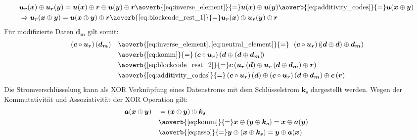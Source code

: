 \begin{align}
& \boldsymbol{u_r}(\boldsymbol{x}) \oplus \boldsymbol{u_r}(\boldsymbol{y}) = \boldsymbol{u}(\boldsymbol{x}) \oplus \boldsymbol{r} \oplus \boldsymbol{u}(\boldsymbol{y}) \oplus \boldsymbol{r} \aoverb{\ref{eq:inverse_element}}{=} \boldsymbol{u}(\boldsymbol{x}) \oplus \boldsymbol{u}(\boldsymbol{y}) \aoverb{\ref{eq:additivity_codes}}{=} \boldsymbol{u}(\boldsymbol{x} \oplus \boldsymbol{y}) \label{eq:blockcode_rest_1} \\
& \Rightarrow \boldsymbol{u_r}(\boldsymbol{x} \oplus \boldsymbol{y}) = \boldsymbol{u}(\boldsymbol{x} \oplus \boldsymbol{y}) \oplus \boldsymbol{r} \aoverb{\ref{eq:blockcode_rest_1}}{=} \boldsymbol{u_r}(\boldsymbol{x}) \oplus \boldsymbol{u_r}(\boldsymbol{y}) \oplus \boldsymbol{r} \label{eq:blockcode_rest_2}
\end{align}\noindent
Für modifizierte Daten $\boldsymbol{d_m}$ gilt somit:
\begin{equation}\label{eq:mod_data}
\begin{aligned}
& \left( \boldsymbol{c} \circ \boldsymbol{u_r} \right) \left(\boldsymbol{d_m}\right) & &\aoverb{\ref{eq:inverse_element},\ref{eq:neutral_element}}{=} \,\,\,\left( \boldsymbol{c} \circ \boldsymbol{u_r} \right) \left((\boldsymbol{d} \oplus \boldsymbol{d}\right) \oplus \boldsymbol{d_m}\right) \\ 
& & &\aoverb{\ref{eq:komm}}{=} \left( \boldsymbol{c} \circ \boldsymbol{u_r} \right) \left(\boldsymbol{d} \oplus \left(\boldsymbol{d} \oplus \boldsymbol{d_m}\right)) \\
& & &\aoverb{\ref{eq:blockcode_rest_2}}{=} \boldsymbol{c}\left(\boldsymbol{u_r}\left(\boldsymbol{d}\right) \oplus \boldsymbol{u_r}\left(\boldsymbol{d} \oplus \boldsymbol{d_m}\right) \oplus \boldsymbol{r}\right) \\
& & &\aoverb{\ref{eq:additivity_codes}}{=} \left( \boldsymbol{c} \circ \boldsymbol{u_r} \right) \left(\boldsymbol{d}\right) \oplus \left( \boldsymbol{c} \circ \boldsymbol{u_r} \right) \left(\boldsymbol{d} \oplus \boldsymbol{d_m}\right) \oplus \boldsymbol{c}\left(\boldsymbol{r}\right)
\end{aligned}
\end{equation}\noindent
Die Stromverschlüsselung kann als \ac{XOR} Verknüpfung eines Datenstroms mit dem Schlüsselstrom $\boldsymbol{k_s}$ dargestellt werden. 
Wegen der Kommutativität und Assoziativität der \ac{XOR} Operation gilt:
\begin{equation}\label{eq:streamcipher}
\begin{aligned}
& \boldsymbol{a}(\boldsymbol{x} \oplus \boldsymbol{y}) & &= (\boldsymbol{x} \oplus \boldsymbol{y}) \oplus \boldsymbol{k_s} \\ 
& & &\aoverb{\ref{eq:komm}}{=} \boldsymbol{x} \oplus (\boldsymbol{y} \oplus \boldsymbol{k_s}) =  \boldsymbol{x} \oplus \boldsymbol{a}(\boldsymbol{y}) \\
& & &\aoverb{\ref{eq:asso}}{=} \boldsymbol{y} \oplus (\boldsymbol{x} \oplus \boldsymbol{k_s}) = \boldsymbol{y} \oplus \boldsymbol{a}(\boldsymbol{x})
\end{aligned}
\end{equation}\noindent
